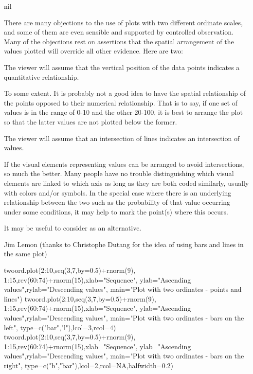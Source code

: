 \begin{Value}
nil
\end{Value}
\begin{Note}\relax
There are many objections to the use of plots with two different 
ordinate scales, and some of them are even sensible and supported by 
controlled observation. Many of the objections rest on assertions that the 
spatial arrangement of the values plotted will override all other 
evidence. Here are two:

The viewer will assume that the vertical position of the data points 
indicates a quantitative relationship.

To some extent. It is probably not a good idea to have the spatial 
relationship of the points opposed to their numerical relationship. That 
is to say, if one set of values is in the range of 0-10 and the other 
20-100, it is best to arrange the plot so that the latter values are 
not plotted below the former.

The viewer will assume that an intersection of lines indicates an 
intersection of values.

If the visual elements representing values can be arranged to avoid 
intersections, so much the better. Many people have no trouble 
distinguishing which visual elements are linked to which axis as long as 
they are both coded similarly, usually with colors and/or symbols. In the 
special case where there is an underlying relationship between the two 
such as the probability of that value occurring under some conditions, it 
may help to mark the point(s) where this occurs.

It may be useful to consider  as an alternative.
\end{Note}
\begin{Author}\relax
Jim Lemon (thanks to Christophe Dutang for the idea of using bars and lines
in the same plot)
\end{Author}
\begin{SeeAlso}\relax
{}
\end{SeeAlso}
\begin{Examples}
\begin{ExampleCode}
 twoord.plot(2:10,seq(3,7,by=0.5)+rnorm(9),
  1:15,rev(60:74)+rnorm(15),xlab="Sequence",
  ylab="Ascending values",rylab="Descending values",
  main="Plot with two ordinates - points and lines")
 twoord.plot(2:10,seq(3,7,by=0.5)+rnorm(9),
  1:15,rev(60:74)+rnorm(15),xlab="Sequence",
  ylab="Ascending values",rylab="Descending values",
  main="Plot with two ordinates - bars on the left",
  type=c("bar","l"),lcol=3,rcol=4)
 twoord.plot(2:10,seq(3,7,by=0.5)+rnorm(9),
  1:15,rev(60:74)+rnorm(15),xlab="Sequence",
  ylab="Ascending values",rylab="Descending values",
  main="Plot with two ordinates - bars on the right",
  type=c("b","bar"),lcol=2,rcol=NA,halfwidth=0.2)
\end{ExampleCode}
\end{Examples}

